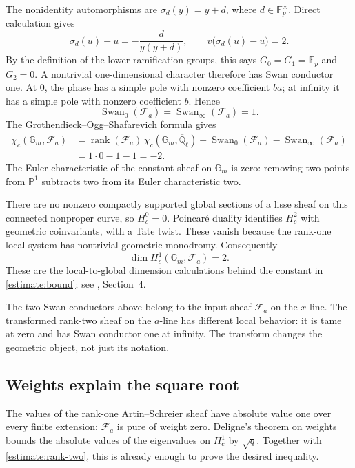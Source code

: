 \documentclass[11pt]{article}
\theoremstyle{remark}
\begin{document}
The nonidentity automorphisms are \(\sigma_d(y)=y+d\), where \(d\in\mathbb F_p^\times\). Direct calculation gives
\[
\sigma_d(u)-u=-\frac{d}{y(y+d)},\qquad
v\bigl(\sigma_d(u)-u\bigr)=2.
\]
By the definition of the lower ramification groups, this says \(G_0=G_1=\mathbb F_p\) and \(G_2=0\). A nontrivial one-dimensional character therefore has Swan conductor one. At \(0\), the phase has a simple pole with nonzero coefficient \(ba\); at infinity it has a simple pole with nonzero coefficient \(b\). Hence
\[
\operatorname{Swan}_0(\mathcal F_a)
=\operatorname{Swan}_\infty(\mathcal F_a)=1.
\]
The Grothendieck--Ogg--Shafarevich formula gives
\begin{align*}
\chi_c(\mathbb G_m,\mathcal F_a)
&=\operatorname{rank}(\mathcal F_a)\,
\chi_c(\mathbb G_m,\overline{\mathbb Q}_\ell)
-\operatorname{Swan}_0(\mathcal F_a)
-\operatorname{Swan}_\infty(\mathcal F_a)\\
&=1\cdot0-1-1=-2.
\end{align*}
The Euler characteristic of the constant sheaf on \(\mathbb G_m\) is zero: removing two points from \(\mathbb P^1\) subtracts two from its Euler characteristic two.

There are no nonzero compactly supported global sections of a lisse sheaf on this connected nonproper curve, so \(H_c^0=0\). Poincar\'e duality identifies \(H_c^2\) with geometric coinvariants, with a Tate twist. These vanish because the rank-one local system has nontrivial geometric monodromy. Consequently
\begin{equation}
\dim H_c^1(\mathbb G_m,\mathcal F_a)=2.
\label{estimate:rank-two}
\end{equation}
These are the local-to-global dimension calculations behind the constant in \eqref{estimate:bound}; see \cite{michel-applied}, Section~4.

The two Swan conductors above belong to the input sheaf \(\mathcal F_a\) on the \(x\)-line. The transformed rank-two sheaf on the \(a\)-line has different local behavior: it is tame at zero and has Swan conductor one at infinity. The transform changes the geometric object, not just its notation.

\subsection{Weights explain the square root}

The values of the rank-one Artin--Schreier sheaf have absolute value one over every finite extension: \(\mathcal F_a\) is pure of weight zero. Deligne's theorem on weights bounds the absolute values of the eigenvalues on \(H_c^1\) by \(\sqrt q\). Together with \eqref{estimate:rank-two}, this is already enough to prove the desired inequality.
\end{document}
